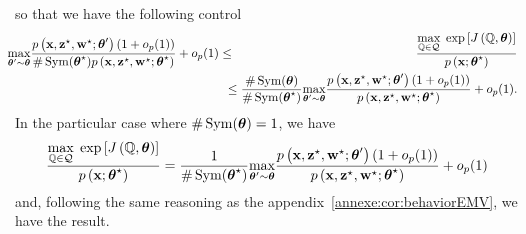 so that we have the following control
\begin{eqnarray*}
\!\!\!\!\underset{\btheta'\sim\btheta}{\max}\frac{\prob\left(\bx,\bzs,\bws;\btheta'\right)\left(1+o_p(1)\right)}{\# \Symmetric(\bthetas)\prob\left(\bx,\bzs,\bws;\bthetas\right)}+o_p(1)\leq &\!\!\!\!&\!\!\!\!\!\!\!\!\!\!\!\!\frac{\underset{\setQ\in\mcQ}{\max}\;\exp\left[\Jvar\left(\setQ,\btheta\right)\right]}{\prob\left(\bx;\bthetas\right)}\\
&\!\!\!\!&\!\!\!\! \leq\frac{\# \Symmetric(\btheta)}{\# \Symmetric(\bthetas)}\underset{\btheta'\sim\btheta}{\max}\frac{\prob\left(\bx,\bzs,\bws;\btheta'\right)\left(1+o_p(1)\right)}{\prob\left(\bx,\bzs,\bws;\bthetas\right)}+o_p(1).\\
\end{eqnarray*}
In the particular case where $\# \operatorname{Sym}(\boldsymbol{\theta})=1$, we have
\[\frac{\underset{\mathbb{Q}\in\mathcal{Q}}{\max}\;\exp\left[J\left(\mathbb{Q},\boldsymbol{\theta}\right)\right]}{p\left(\mathbf{x};\boldsymbol{\theta}^\star\right)} =\frac{1}{\# \operatorname{Sym}(\boldsymbol{\theta}^\star)}\underset{\boldsymbol{\theta}'\sim\boldsymbol{\theta}}{\max}\frac{p\left(\mathbf{x},\mathbf{z}^\star,\mathbf{w}^\star;\boldsymbol{\theta}'\right)\left(1+o_p(1)\right)}{p\left(\mathbf{x},\mathbf{z}^\star,\mathbf{w}^\star;\boldsymbol{\theta}^\star\right)}+o_p(1)\]
and, following the same reasoning as the appendix~\ref{annexe:cor:behaviorEMV}, we have the result.\\

